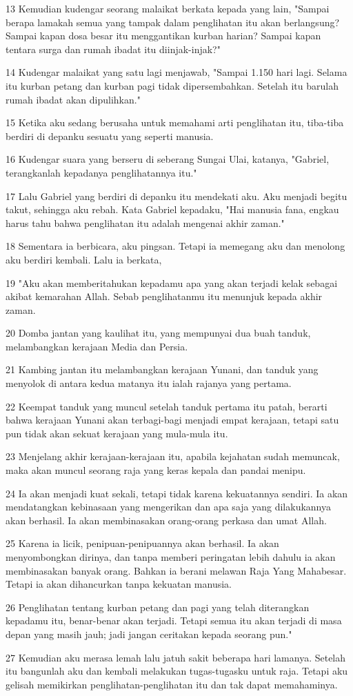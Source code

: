 \par 13 Kemudian kudengar seorang malaikat berkata kepada yang lain, "Sampai berapa lamakah semua yang tampak dalam penglihatan itu akan berlangsung? Sampai kapan dosa besar itu menggantikan kurban harian? Sampai kapan tentara surga dan rumah ibadat itu diinjak-injak?"
\par 14 Kudengar malaikat yang satu lagi menjawab, "Sampai 1.150 hari lagi. Selama itu kurban petang dan kurban pagi tidak dipersembahkan. Setelah itu barulah rumah ibadat akan dipulihkan."
\par 15 Ketika aku sedang berusaha untuk memahami arti penglihatan itu, tiba-tiba berdiri di depanku sesuatu yang seperti manusia.
\par 16 Kudengar suara yang berseru di seberang Sungai Ulai, katanya, "Gabriel, terangkanlah kepadanya penglihatannya itu."
\par 17 Lalu Gabriel yang berdiri di depanku itu mendekati aku. Aku menjadi begitu takut, sehingga aku rebah. Kata Gabriel kepadaku, "Hai manusia fana, engkau harus tahu bahwa penglihatan itu adalah mengenai akhir zaman."
\par 18 Sementara ia berbicara, aku pingsan. Tetapi ia memegang aku dan menolong aku berdiri kembali. Lalu ia berkata,
\par 19 "Aku akan memberitahukan kepadamu apa yang akan terjadi kelak sebagai akibat kemarahan Allah. Sebab penglihatanmu itu menunjuk kepada akhir zaman.
\par 20 Domba jantan yang kaulihat itu, yang mempunyai dua buah tanduk, melambangkan kerajaan Media dan Persia.
\par 21 Kambing jantan itu melambangkan kerajaan Yunani, dan tanduk yang menyolok di antara kedua matanya itu ialah rajanya yang pertama.
\par 22 Keempat tanduk yang muncul setelah tanduk pertama itu patah, berarti bahwa kerajaan Yunani akan terbagi-bagi menjadi empat kerajaan, tetapi satu pun tidak akan sekuat kerajaan yang mula-mula itu.
\par 23 Menjelang akhir kerajaan-kerajaan itu, apabila kejahatan sudah memuncak, maka akan muncul seorang raja yang keras kepala dan pandai menipu.
\par 24 Ia akan menjadi kuat sekali, tetapi tidak karena kekuatannya sendiri. Ia akan mendatangkan kebinasaan yang mengerikan dan apa saja yang dilakukannya akan berhasil. Ia akan membinasakan orang-orang perkasa dan umat Allah.
\par 25 Karena ia licik, penipuan-penipuannya akan berhasil. Ia akan menyombongkan dirinya, dan tanpa memberi peringatan lebih dahulu ia akan membinasakan banyak orang. Bahkan ia berani melawan Raja Yang Mahabesar. Tetapi ia akan dihancurkan tanpa kekuatan manusia.
\par 26 Penglihatan tentang kurban petang dan pagi yang telah diterangkan kepadamu itu, benar-benar akan terjadi. Tetapi semua itu akan terjadi di masa depan yang masih jauh; jadi jangan ceritakan kepada seorang pun."
\par 27 Kemudian aku merasa lemah lalu jatuh sakit beberapa hari lamanya. Setelah itu bangunlah aku dan kembali melakukan tugas-tugasku untuk raja. Tetapi aku gelisah memikirkan penglihatan-penglihatan itu dan tak dapat memahaminya.

